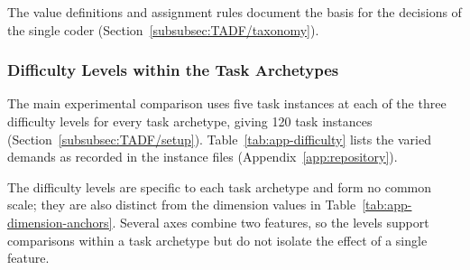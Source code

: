The value definitions and assignment rules document the basis for the decisions of the single coder (Section~\ref{subsubsec:TADF/taxonomy}).

\subsubsection{Difficulty Levels within the Task Archetypes}
\label{app:taxonomy/difficulty}
The main experimental comparison uses five task instances at each of the three difficulty levels for every task archetype, giving 120 task instances (Section~\ref{subsubsec:TADF/setup}). Table~\ref{tab:app-difficulty} lists the varied demands as recorded in the instance files (Appendix~\ref{app:repository}).

The difficulty levels are specific to each task archetype and form no common scale; they are also distinct from the dimension values in Table~\ref{tab:app-dimension-anchors}. Several axes combine two features, so the levels support comparisons within a task archetype but do not isolate the effect of a single feature.

